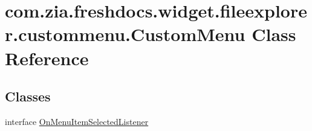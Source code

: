 \hypertarget{classcom_1_1zia_1_1freshdocs_1_1widget_1_1fileexplorer_1_1custommenu_1_1_custom_menu}{\section{com.\-zia.\-freshdocs.\-widget.\-fileexplorer.\-custommenu.\-Custom\-Menu Class Reference}
\label{classcom_1_1zia_1_1freshdocs_1_1widget_1_1fileexplorer_1_1custommenu_1_1_custom_menu}
}
\subsection*{Classes}
\begin{DoxyCompactItemize}
\item 
interface \hyperlink{interfacecom_1_1zia_1_1freshdocs_1_1widget_1_1fileexplorer_1_1custommenu_1_1_custom_menu_1_1_on_menu_item_selected_listener}{On\-Menu\-Item\-Selected\-Listener}
\end{DoxyCompactItemize}
